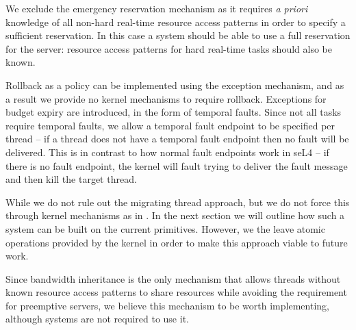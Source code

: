 We exclude the emergency reservation mechanism as it requires \emph{a priori} knowledge of all non-hard real-time resource access patterns in order to specify a sufficient reservation.
In this case a system should be able to use a full reservation for the server: resource access patterns for hard real-time tasks should also be known.

Rollback as a policy can be implemented using the exception mechanism, and as a result we provide no kernel mechanisms to require rollback.
Exceptions for budget expiry are introduced, in the form of temporal faults.
Since not all tasks require temporal faults, we allow a temporal fault endpoint to be specified per thread -- if a thread does not have a temporal fault endpoint then no fault will be delivered.
This is in contrast to how normal fault endpoints work in seL4 -- if there is no fault endpoint, the kernel will fault trying to deliver the fault message and then kill the target thread.

While we do not rule out the migrating thread approach, but we do not force this through kernel mechanisms as in \composite.
In the next section we will outline how such a system can be built on the current primitives.
However, we the leave atomic operations provided by the kernel in order to make this approach viable to future work.

Since bandwidth inheritance is the only mechanism that allows threads without known resource access patterns to share resources while avoiding the requirement for preemptive servers, we believe this mechanism to be worth implementing, although systems are not required to use it.

